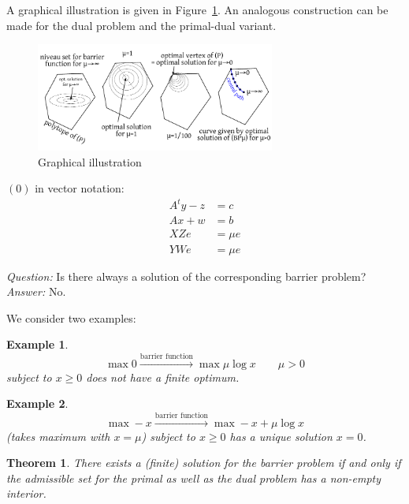 \documentclass[a4paper]{article}
\newcounter{lecref}[section]
\numberwithin{lecref}{section}
\newtheorem{theorem}[lecref]{Theorem}
\newtheorem*{Example}{Example}
\begin{document}
A graphical illustration is given in Figure~\ref{img:graphical}.
An analogous construction can be made for the dual problem and the primal-dual variant.
\begin{figure}[!ht]
	\begin{center}
		\includegraphics[width=0.7\textwidth]{img/10_inner_point_method_graphical_illustration.pdf}
		\caption{Graphical illustration}
		\label{img:graphical}
	\end{center}
\end{figure}

$(0)$ in vector notation:
\begin{align*}
	A^t y - z &= c \\
	Ax + w &= b \\
	XZ e &= \mu e \\
	YW e &= \mu e
\end{align*}

\emph{Question:} Is there always a solution of the corresponding barrier problem? \\
\emph{Answer:} No.

We consider two examples:
\begin{Example}
	\[ \max 0 \xrightarrow{\text{barrier function}} \max \mu \log x \qquad \mu > 0 \]
	subject to $x \geq 0$ does not have a finite optimum.
\end{Example}
\begin{Example}
	\[ \max -x \xrightarrow{\text{barrier function}} \max -x + \mu \log x \]
	(takes maximum with $x = \mu$) subject to $x \geq 0$ has a unique solution $x = 0$.
\end{Example}

\begin{theorem}
	\label{theorem:5.1}
	There exists a (finite) solution for the barrier problem if and only if the admissible set for the primal as well as the dual problem has a non-empty interior.
\end{theorem}
\end{document}
